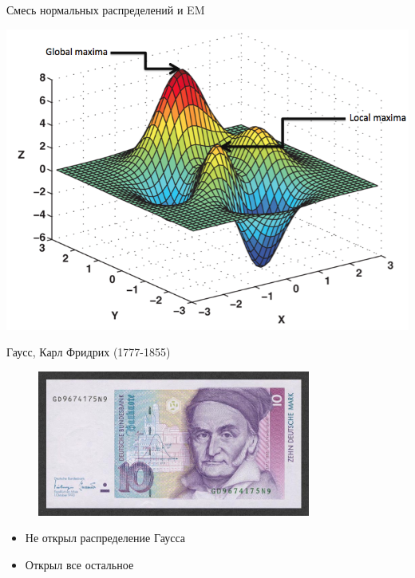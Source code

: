 \documentclass[aspectratio=169]{beamer}
\begin{document}
\begin{frame}{}

\begin{center}
{\LARGE Смесь нормальных распределений и EM}

\vspace{2em}
\includegraphics[scale=0.3]{images/local.png}
\end{center}

\end{frame}

\begin{frame}{Гаусс, Карл Фридрих (1777-1855)}

\begin{figure}
	\centering  
	\includegraphics[width=0.8\textwidth]{images/gauss.jpg}
\end{figure}

\begin{itemize}
\item Не открыл распределение Гаусса
\item Открыл все остальное
\end{itemize}

\end{frame}
\end{document}
